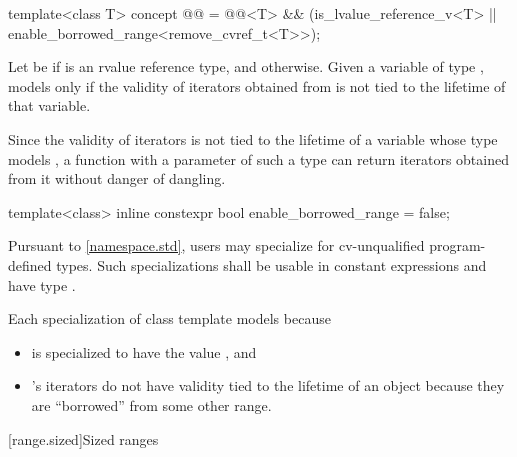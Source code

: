 \begin{itemdecl}
template<class T>
  concept @@ =
    @@<T> && (is_lvalue_reference_v<T> || enable_borrowed_range<remove_cvref_t<T>>);
\end{itemdecl}

\begin{itemdescr}
\pnum
Let  be 
if  is an rvalue reference type, and  otherwise.
Given a variable  of type ,
 models  only if
the validity of iterators obtained from 
is not tied to the lifetime of that variable.

\pnum
\begin{note}
Since the validity of iterators is not tied to the lifetime of
a variable whose type models ,
a function with a parameter of such a type can
return iterators obtained from it without danger of dangling.
\end{note}
\end{itemdescr}

%
\begin{itemdecl}
template<class>
  inline constexpr bool enable_borrowed_range = false;
\end{itemdecl}

\begin{itemdescr}
\pnum
\remarks
Pursuant to \ref{namespace.std}, users may specialize 
for cv-unqualified program-defined types.
Such specializations shall be
usable in constant expressions and
have type .

\pnum
\begin{example}
Each specialization  of class template 
models  because
\begin{itemize}
\item
{} is specialized
to have the value , and

\item
{}'s iterators
do not have validity tied to the lifetime of an  object
because they are ``borrowed'' from some other range.
\end{itemize}
\end{example}
\end{itemdescr}

[range.sized]{Sized ranges}

